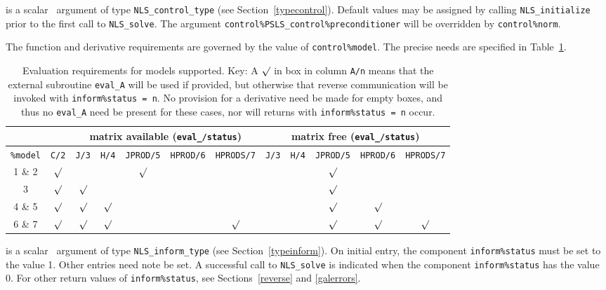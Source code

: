 \documentclass{galahad}
\newcommand{\packagename}{NLS}
\begin{document}
\begin{description}
 is a scalar \intentin\ argument of type
{\tt \packagename\_control\_type}
(see Section~\ref{typecontrol}). Default values may be assigned by calling
{\tt \packagename\_initialize} prior to the first call to
{\tt \packagename\_solve}. The argument
{\tt control\%PSLS\_control\-\%preconditioner}
will be overridden by {\tt control\%norm}.

\noindent
The function and derivative requirements are governed by the value of
{\tt control\%model}. The precise needs are specified in Table~\ref{tab-er}.

\begin{table}[h]
\begin{tabular}{|c||c|c|c|c|c|c||c|c|c|c|c|}
\hline
& & \multicolumn{5}{c||}{matrix available ({\tt eval\_/status})}
& \multicolumn{5}{c|}{matrix free ({\tt eval\_/status})} \\
\hline
{\tt \%model}  & {\tt C/2}
 & {\tt J/3} & {\tt H/4} & {\tt JPROD/5} & {\tt HPROD/6} & {\tt HPRODS/7}
 & {\tt J/3} & {\tt H/4} & {\tt JPROD/5} & {\tt HPROD/6} & {\tt HPRODS/7} \\
\hline
1 \& 2 & $\surd$ & & & $\surd$ & & &  & & $\surd$ & & \\
3      & $\surd$ & $\surd$ & & & & &  & & $\surd$ & & \\
\hline
4 \& 5 & $\surd$ & $\surd$ & $\surd$ & & & & & & $\surd$ & $\surd$ & \\
6 \& 7 & $\surd$ & $\surd$ & $\surd$ & & & $\surd$ &
                 & & $\surd$ & $\surd$ & $\surd$ \\
\hline
\end{tabular}
\caption{\label{tab-er} Evaluation requirements for models supported. Key:
A $\surd$ in box in column
{\tt A/n} means that the external subroutine {\tt eval\_A} will be used
if provided, but otherwise that reverse communication will be invoked with
{\tt inform\%status = n}. No provision for a derivative need be made
for empty boxes, and thus no {\tt eval\_A} need be present for these cases,
nor will returns with {\tt inform\%status = n} occur.}
\end{table}

 is a scalar \intentinout\ argument of type
{\tt \packagename\_inform\_type}
(see Section~\ref{typeinform}).
On initial entry, the  component {\tt inform\%status} must be set to the
value 1. Other entries need note be set.
A successful call to
{\tt \packagename\_solve}
is indicated when the  component {\tt inform\%status} has the value 0.
For other return values of {\tt inform\%status}, see
Sections~\ref{reverse} and \ref{galerrors}.


\end{description}
\end{document}

